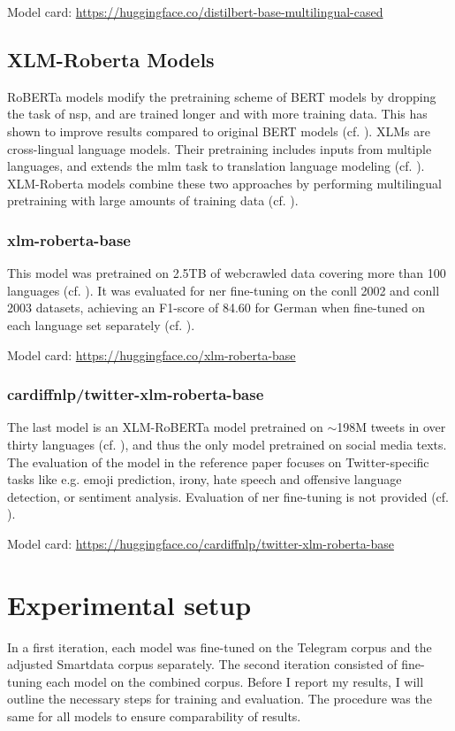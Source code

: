 Model card: \url{https://huggingface.co/distilbert-base-multilingual-cased}

\subsection{XLM-Roberta Models}
RoBERTa models modify the pretraining scheme of BERT models by dropping the task of \gls{nsp}, and are trained longer and with more training data. This has shown to improve results compared to original BERT models (cf. \cite[80]{tunstall_natural_2022}). XLMs are cross-lingual language models. Their pretraining includes inputs from multiple languages, and extends the \gls{mlm} task to translation language modeling (cf. \cite[80]{tunstall_natural_2022}). XLM-Roberta models combine these two approaches by performing multilingual pretraining with large amounts of training data (cf. \cite[80]{tunstall_natural_2022}).

\subsubsection{xlm-roberta-base}
This model was pretrained on 2.5TB of webcrawled data covering more than 100 languages (cf. \cite{xlm_roberta}). It was evaluated for \gls{ner} fine-tuning on the \gls{conll} 2002 and \gls{conll} 2003 datasets, achieving an F1-score of 84.60 for German when fine-tuned on each language set separately (cf. \cite{xlm_roberta}).

Model card: \url{https://huggingface.co/xlm-roberta-base} 

\subsubsection{cardiffnlp/twitter-xlm-roberta-base}
The last model is an XLM-RoBERTa model pretrained on $\sim$198M tweets in over thirty languages (cf. \cite{xlm_roberta_twitter}), and thus the only model pretrained on social media texts. 
The evaluation of the model in the reference paper focuses on Twitter-specific tasks like e.g. emoji prediction, irony, hate speech and offensive language detection, or sentiment analysis. Evaluation of \gls{ner} fine-tuning is not provided (cf. \cite{xlm_roberta_twitter}).

Model card: \url{https://huggingface.co/cardiffnlp/twitter-xlm-roberta-base}

\section{Experimental setup}
In a first iteration, each model was fine-tuned on the Telegram corpus and the adjusted Smartdata corpus separately. The second iteration consisted of fine-tuning each model on the combined corpus.
Before I report my results, I will outline the necessary steps for training and evaluation. The procedure was the same for all models to ensure comparability of results. 

